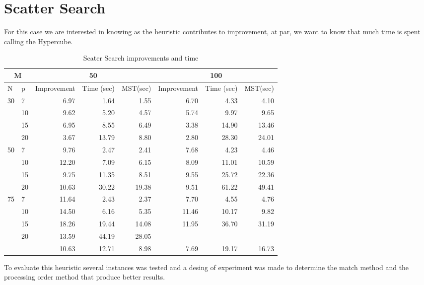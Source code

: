 \section{Scatter Search}
For this case
we are interested in knowing
as the heuristic contributes to improvement,
at par,
we want to know
that much time is spent
calling the Hypercube.

\begin{table}[h]
  \begin{tabular}{|l|l|r|r|r|r|r|r|}
    \hline
    \multicolumn{2}{|c|}{M}
    & \multicolumn{3}{|c|}{50}
    & \multicolumn{3}{|c|}{100} \\ \hline 
    N & p & Improvement & Time (sec) & MST(sec)
    & Improvement & Time (sec) & MST(sec) \\ \hline
    \multirow{4}{*}{30}
    & 7 & 6.97 & 1.64 & 1.55
    & 6.70 & 4.33 & 4.10 \\
    & 10 & 9.62 & 5.20 & 4.57
    & 5.74 & 9.97 & 9.65 \\
    & 15 & 6.95 & 8.55 & 6.49
    & 3.38 & 14.90 & 13.46 \\
    & 20 & 3.67 & 13.79 & 8.80
    & 2.80 & 28.30 & 24.01 \\ \hline
    \multirow{4}{*}{50}
    & 7 & 9.76 & 2.47 & 2.41
    & 7.68 & 4.23 & 4.46 \\
    & 10 & 12.20 & 7.09 & 6.15
    & 8.09 & 11.01 & 10.59 \\
    & 15 & 9.75 & 11.35 & 8.51
    & 9.55 & 25.72 & 22.36 \\
    & 20 & 10.63 & 30.22 & 19.38
    & 9.51 & 61.22 & 49.41 \\ \hline
    \multirow{4}{*}{75}
    & 7 & 11.64 & 2.43 & 2.37
    & 7.70 & 4.55 & 4.76 \\
    & 10 & 14.50 & 6.16 & 5.35
    & 11.46 & 10.17 & 9.82 \\
    & 15 & 18.26 & 19.44 & 14.08
    & 11.95 & 36.70 & 31.19 \\
    & 20 & 13.59 & 44.19 & 28.05
    & & & \\ \hline
    & & 10.63 & 12.71 & 8.98
    & 7.69 & 19.17 & 16.73 \\
    \hline
  \end{tabular}
  \caption[Table caption text]{Scater Search improvements and time}
  \label{tab:SS}
\end{table}
To evaluate this heuristic
several instances was tested
and
a desing of experiment was made
to determine
the match method
and the processing order method
that produce better results.

